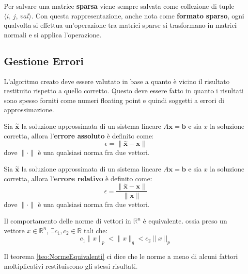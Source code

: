 Per salvare una matrice \textbf{sparsa} viene sempre salvata come collezione di
tuple $\langle i, \, j,\, val\rangle$. Con questa rappresentazione, anche nota
come \textbf{formato sparso}, ogni qualvolta si effettua un'operazione tra matrici
sparse si trasformano in matrici normali e si applica l'operazione.
\subsection{Gestione Errori}
L'algoritmo creato deve essere valutato in base a quanto è vicino il risultato
restituito rispetto a quello corretto. Questo deve essere fatto in quanto
i risultati sono spesso forniti come numeri floating point e quindi soggetti
a errori di approssimazione.

\begin{definizione}
    Sia $\stackrel{\sim}{\textbf{x}}$ la soluzione approssimata di un sistema
    lineare $A\textbf{x} = \textbf{b}$ e sia $x$ la soluzione corretta, allora
    l'\textbf{errore assoluto} è definito come:
    \begin{equation}
        \epsilon = \|\stackrel{\sim}{\textbf{x}} - \textbf{x}\|
    \end{equation}
    dove $\|\cdot\|$ è una qualsiasi norma fra due vettori.
\end{definizione}
\begin{definizione}
    Sia $\stackrel{\sim}{\textbf{x}}$ la soluzione approssimata di un sistema
    lineare $A\textbf{x} = \textbf{b}$ e sia $x$ la soluzione corretta, allora
    l'\textbf{errore relativo} è definito come:
    \begin{equation}
        \epsilon = \frac{\|\stackrel{\sim}{\textbf{x}} - \textbf{x}\|}{\|\textbf{x}\|}
    \end{equation}
    dove $\|\cdot\|$ è una qualsiasi norma fra due vettori.
\end{definizione}
\begin{teorema}\label{teo:NormeEquivalenti}
    Il comportamento delle norme di vettori in $\mathbb{R}^n$ è equivalente. ossia
    preso un vettore $x\in \mathbb{R}^n$, $\exists c_1,c_2\in \mathbb{R}$ tali che:
    \begin{equation}
        c_1\|x\|_p < \|x\|_q < c_2\|x\|_p
    \end{equation}
\end{teorema}
Il teorema \ref{teo:NormeEquivalenti} ci dice che le norme a meno di alcuni
fattori moltiplicativi restituiscono gli stessi risultati.
